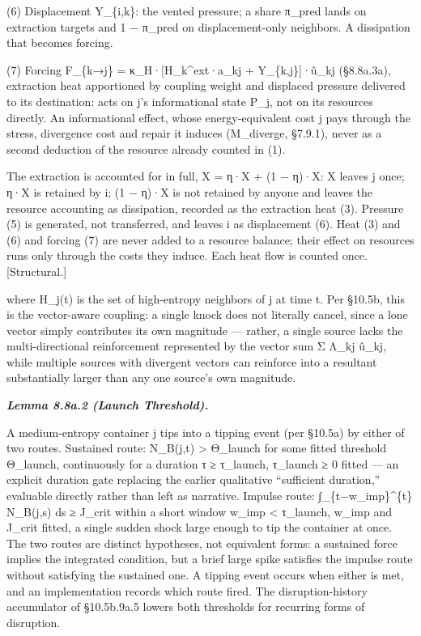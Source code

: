 \documentclass[
]{article}
\begin{document}
(6) Displacement Y\_\{i,k\}: the vented pressure; a share π\_pred lands
on extraction targets and 1 − π\_pred on displacement-only neighbors. A
dissipation that becomes forcing.

(7) Forcing F\_\{k→j\} = κ\_H·{[}H\_k\^{}ext·a\_kj + Y\_\{k,j\}{]}·û\_kj
(§8.8a.3a), extraction heat apportioned by coupling weight and displaced
pressure delivered to its destination: acts on j's informational state
P\_j, not on its resources directly. An informational effect, whose
energy-equivalent cost j pays through the stress, divergence cost and
repair it induces (M\_diverge, §7.9.1), never as a second deduction of
the resource already counted in (1).

The extraction is accounted for in full, X = η·X + (1 − η)·X: X leaves j
once; η·X is retained by i; (1 − η)·X is not retained by anyone and
leaves the resource accounting as dissipation, recorded as the
extraction heat (3). Pressure (5) is generated, not transferred, and
leaves i as displacement (6). Heat (3) and (6) and forcing (7) are never
added to a resource balance; their effect on resources runs only through
the costs they induce. Each heat flow is counted once. {[}Structural.{]}

where H\_j(t) is the set of high-entropy neighbors of j at time t. Per
§10.5b, this is the vector-aware coupling: a single knock does not
literally cancel, since a lone vector simply contributes its own
magnitude --- rather, a single source lacks the multi-directional
reinforcement represented by the vector sum Σ Λ\_kj û\_kj, while
multiple sources with divergent vectors can reinforce into a resultant
substantially larger than any one source's own magnitude.

\emph{\textbf{Lemma 8.8a.2 (Launch Threshold).}}

A medium-entropy container j tips into a tipping event (per §10.5a) by
either of two routes. Sustained route: N\_B(j,t) \textgreater{}
Θ\_launch for some fitted threshold Θ\_launch, continuously for a
duration τ ≥ τ\_launch, τ\_launch ≥ 0 fitted --- an explicit duration
gate replacing the earlier qualitative ``sufficient duration,''
evaluable directly rather than left as narrative. Impulse route:
∫\_\{t−w\_imp\}\^{}\{t\} N\_B(j,s) ds ≥ J\_crit within a short window
w\_imp \textless{} τ\_launch, w\_imp and J\_crit fitted, a single sudden
shock large enough to tip the container at once. The two routes are
distinct hypotheses, not equivalent forms: a sustained force implies the
integrated condition, but a brief large spike satisfies the impulse
route without satisfying the sustained one. A tipping event occurs when
either is met, and an implementation records which route fired. The
disruption-history accumulator of §10.5b.9a.5 lowers both thresholds for
recurring forms of disruption.
\end{document}
